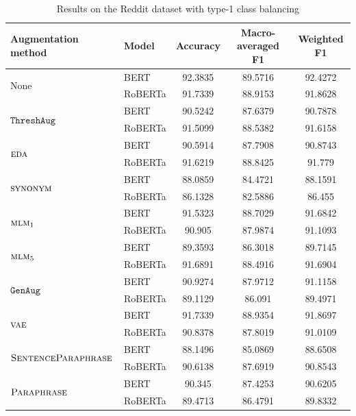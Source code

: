 \documentclass[11pt,a4paper]{article}
\newcommand{\noaug}{$\textrm{None}$}
\newcommand{\senttfpara}{$\textsc{SentenceParaphrase}$}
\newcommand{\tfpara}{$\textsc{Paraphrase}$}
\newcommand{\eda}{$\textsc{eda}$}
\newcommand{\synonym}{$\textsc{synonym}$}
\newcommand{\mlmone}{$\textsc{mlm}_1$}
\newcommand{\mlmfive}{$\textsc{mlm}_5$}
\newcommand{\genaug}{$\texttt{GenAug}$}
\newcommand{\threshaug}{$\texttt{ThreshAug}$}
\newcommand{\vae}{$\textsc{vae}$}
\begin{document}
\begin{table}[]
    \small
    \centering
    \begin{tabular}{llccc}
        \toprule
        \textbf{Augmentation method} & \textbf{Model} & \textbf{Accuracy} & \textbf{Macro-averaged F1} & \textbf{Weighted F1} \\
        \midrule
        \multirow{2}{*}{\noaug} & BERT & 92.3835 & 89.5716 & 92.4272 \\
         & RoBERTa & 91.7339 & 88.9153 & 91.8628 \\\midrule

        \multirow{2}{*}{\threshaug} & BERT & 90.5242 & 87.6379 & 90.7878 \\
         & RoBERTa & 91.5099 & 88.5382 & 91.6158 \\\cmidrule{2-5}
        \multirow{2}{*}{\eda} & BERT & 90.5914 & 87.7908 & 90.8743 \\
         & RoBERTa & 91.6219 & 88.8425 & 91.779 \\\midrule
         
        \multirow{2}{*}{\synonym} & BERT & 88.0859 & 84.4721 & 88.1591 \\
         & RoBERTa & 86.1328 & 82.5886 & 86.455 \\\cmidrule{2-5}
        \multirow{2}{*}{\mlmone} & BERT & 91.5323 & 88.7029 & 91.6842 \\
         & RoBERTa & 90.905 & 87.9874 & 91.1093 \\\cmidrule{2-5}
        \multirow{2}{*}{\mlmfive} & BERT & 89.3593 & 86.3018 & 89.7145 \\
         & RoBERTa & 91.6891 & 88.4916 & 91.6904 \\\midrule

        \multirow{2}{*}{\genaug} & BERT & 90.9274 & 87.9712 & 91.1158 \\
         & RoBERTa & 89.1129 & 86.091 & 89.4971 \\\cmidrule{2-5}
        \multirow{2}{*}{\vae} & BERT & 91.7339 & 88.9354 & 91.8697 \\
        & RoBERTa & 90.8378 & 87.8019 & 91.0109 \\\midrule
         
         \multirow{2}{*}{\senttfpara} & BERT & 88.1496 & 85.0869 & 88.6508 \\
         & RoBERTa & 90.6138 & 87.6919 & 90.8543 \\\cmidrule{2-5}
        \multirow{2}{*}{\tfpara} & BERT & 90.345 & 87.4253 & 90.6205 \\
         & RoBERTa & 89.4713 & 86.4791 & 89.8332 \\
        \bottomrule
    \end{tabular}
    \caption{Results on the Reddit dataset with type-1 class balancing}
    \label{tab:reddit1}
\end{table}
\end{document}
